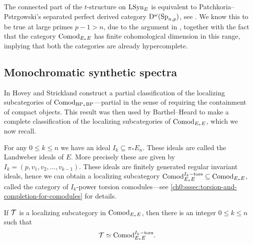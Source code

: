 


\begin{conjecture}
    The connected part of the $t$-structure on $\mathrm{LSyn}_{E}$ is equivalent to Patchkoria--Pstr\a{}gowski's separated perfect derived category $\mathrm{D}^\omega(\mathrm{Sp}_{n,p})$, see \cite[6.49]{patchkoria-pstragowski_2021}. We know this to be true at large primes $p-1>n$, due to the argument in \cite[6.57]{patchkoria-pstragowski_2021}, together with the fact that the category $\mathrm{Comod}_{E_*E}$ has finite cohomological dimension in this range, implying that both the categories are already hypercomplete.
\end{conjecture}




\subsection{Monochromatic synthetic spectra}

In \cite{hovey-strickland_2005a} Hovey and Strickland construct a partial classification of the localizing subcategories of $\mathrm{Comod}_{\mathrm{BP}_*\mathrm{BP}}$---partial in the sense of requiring the containment of compact objects. This result was then used by Barthel--Heard to make a complete classification of the localizing subcategories of $\mathrm{Comod}_{E_*E}$, which we now recall. 

For any $0\leq k\leq n$ we have an ideal $I_k \subseteq \pi_* E_n$. These ideals are called the Landweber ideals of $E$. More precisely these are given by $I_k = (p, v_1, v_2, \ldots, v_{k-1})$. These ideals are finitely generated regular invariant ideals, hence we can obtain a localizing subcategory $\mathrm{Comod}_{E_*E}^{I_k-\mathrm{tors}}\subseteq \mathrm{Comod}_{E_*E}$, called the category of $I_k$-power torsion comodules---see \cref{ch0:sssec:torsion-and-completion-for-comodules} for details. 

\begin{theorem}
    \label{ch3:add:thm:classification-of-abelian-localizing}
    If $\mathcal{T}$ is a localizing subcategory in $\mathrm{Comod}_{E_*E}$, then there is an integer $0\leq k\leq n$ such that 
    \[\mathcal{T} \simeq \mathrm{Comod}_{E_*E}^{I_k-\mathrm{tors}}.\]
\end{theorem}

